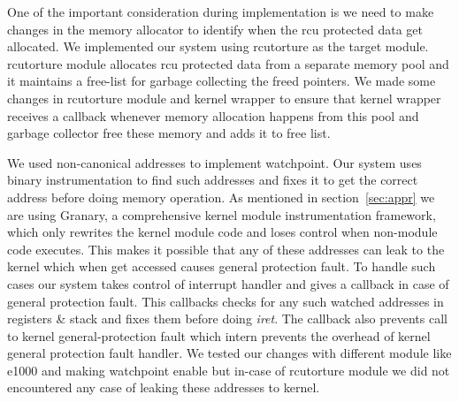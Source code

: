 One of the important consideration during implementation is we need to make changes in the memory allocator to identify when the rcu protected data get allocated. We implemented our system using rcutorture as the target module. rcutorture module allocates rcu protected data from a separate memory pool and it maintains a free-list for garbage collecting the freed pointers. We made some changes in rcutorture module and kernel wrapper to ensure that kernel wrapper receives a callback whenever memory allocation happens from this pool and garbage collector free these memory and adds it to free list. %

We used non-canonical addresses to implement watchpoint. %
Our system uses binary instrumentation to find such addresses and fixes it to get the correct address before doing memory operation. As mentioned in section~\ref{sec:appr} we are using Granary, a comprehensive kernel module instrumentation framework, which only rewrites the kernel module code and loses control when non-module code executes. This makes it possible that any of these addresses can leak to the kernel which when get accessed causes general protection fault. To handle such cases our system takes control of interrupt handler and gives a callback in case of general protection fault. This callbacks checks for any such watched addresses in registers \& stack and fixes them before doing \emph{iret}. The callback also prevents call to kernel general-protection fault which intern  prevents the overhead of kernel general protection fault handler. We tested our changes with different module like e1000 and making watchpoint enable but in-case of rcutorture module we did not encountered any case of leaking these addresses to kernel.
